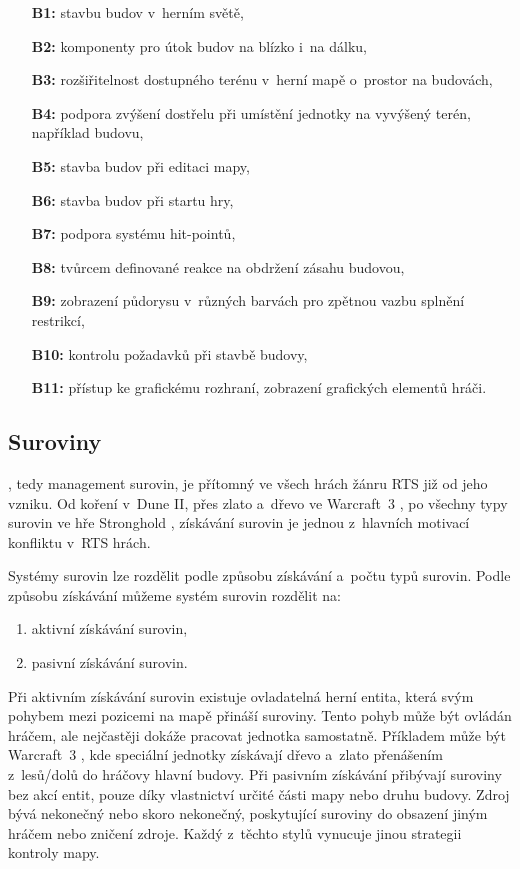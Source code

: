 \begin{itemize}
	\item[\textbf{B1:}] stavbu budov v~herním světě,
	\item[\textbf{B2:}] komponenty pro útok budov na blízko i~na dálku,
	\item[\textbf{B3:}] rozšiřitelnost dostupného terénu v~herní mapě o~prostor na budovách,
	\item[\textbf{B4:}] podpora zvýšení dostřelu při umístění jednotky na vyvýšený terén, například budovu,
	\item[\textbf{B5:}] stavba budov při editaci mapy,
	\item[\textbf{B6:}] stavba budov při startu hry,
	\item[\textbf{B7:}] podpora systému hit-pointů,
	\item[\textbf{B8:}] tvůrcem definované reakce na obdržení zásahu budovou,
	\item[\textbf{B9:}] zobrazení půdorysu v~různých barvách pro zpětnou vazbu splnění restrikcí,
	\item[\textbf{B10:}] kontrolu požadavků při stavbě budovy,
	\item[\textbf{B11:}] přístup ke grafickému rozhraní, zobrazení grafických elementů hráči.
\end{itemize}


\subsection{Suroviny}
\label{sec:suroviny}
, tedy management surovin, je přítomný ve všech hrách žánru RTS již od jeho vzniku. Od koření v~Dune II, přes zlato a~dřevo ve Warcraft~3 \citep{site:warcraft3}, po všechny typy surovin ve hře Stronghold \citep{site:strongholdcrus}, získávání surovin je jednou z~hlavních motivací konfliktu v~RTS hrách. 

Systémy surovin lze rozdělit podle způsobu získávání a~počtu typů surovin. Podle způsobu získávání můžeme systém surovin rozdělit na:
\begin{enumerate}
	\item aktivní získávání surovin,
	\item pasivní získávání surovin.
\end{enumerate}

Při aktivním získávání surovin existuje ovladatelná herní entita, která svým pohybem mezi pozicemi na mapě přináší suroviny. Tento pohyb může být ovládán hráčem, ale nejčastěji dokáže pracovat jednotka samostatně. Příkladem může být Warcraft~3 \citep{site:warcraft3}, kde speciální jednotky získávají dřevo a~zlato přenášením z~lesů/dolů do hráčovy hlavní budovy. Při pasivním získávání přibývají suroviny bez akcí entit, pouze díky vlastnictví určité části mapy nebo druhu budovy. Zdroj bývá nekonečný nebo skoro nekonečný, poskytující suroviny do obsazení jiným hráčem nebo zničení zdroje. Každý z~těchto stylů vynucuje jinou strategii kontroly mapy.

